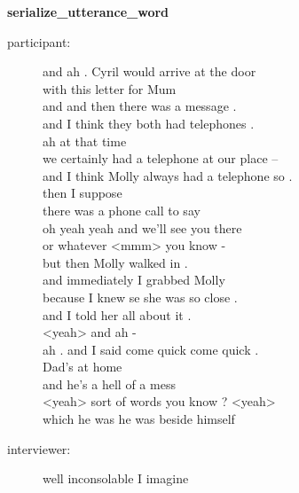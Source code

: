 \documentclass{article}
\newcommand{\turn}[2]{
\item[#1:] #2
}
\begin{document}
\begin{center}\textbf{serialize\_utterance\_word}\end{center}

\begin{description}

\turn{participant}{and ah . Cyril would arrive at the door\\
with this letter for Mum\\
and and then there was a message .\\
and I think they both had telephones .\\
ah at that time\\
we certainly had a telephone at our place --\\
and I think Molly always had a telephone so .\\
then I suppose\\
there was a phone call to say\\
oh yeah yeah and we'll see you there\\
or whatever <mmm> you know -\\
but then Molly walked in .\\
and immediately I grabbed Molly\\
because I knew se she was so close .\\
and I told her all about it .\\
<yeah> and ah -\\
ah . and I said come quick come quick .\\
Dad's at home\\
and he's a hell of a mess\\
<yeah> sort of words you know ? <yeah>\\
which he was he was beside himself}

\turn{interviewer}{well inconsolable I imagine}


\end{description}
\end{document}
